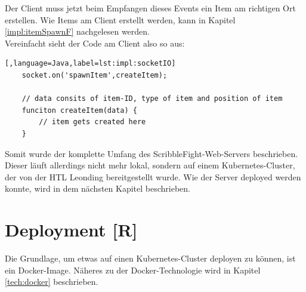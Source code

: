 Der Client muss jetzt beim Empfangen dieses Events ein Item am richtigen Ort erstellen.
Wie Items am Client erstellt werden, kann in Kapitel \ref{impl:itemSpawnF} nachgelesen werden.\\
Vereinfacht sieht der Code am Client also so aus:


\begin{lstlisting}[,language=Java,label=lst:impl:socketIO]
    socket.on('spawnItem',createItem);

    // data consits of item-ID, type of item and position of item
    funciton createItem(data) {
        // item gets created here
    }
 \end{lstlisting}

Somit wurde der komplette Umfang des ScribbleFight-Web-Servers beschrieben. Dieser läuft allerdings nicht mehr lokal, sondern auf einem Kubernetes-Cluster, der von der HTL Leonding bereitgestellt wurde.
Wie der Server deployed werden konnte, wird in dem nächsten Kapitel beschrieben.


\section{Deployment [R]} \label{impl:Deployment}
Die Grundlage, um etwas auf einen Kubernetes-Cluster deployen zu können, ist ein Docker-Image. Näheres zu der Docker-Technologie wird in Kapitel \ref{tech:docker} beschrieben.
